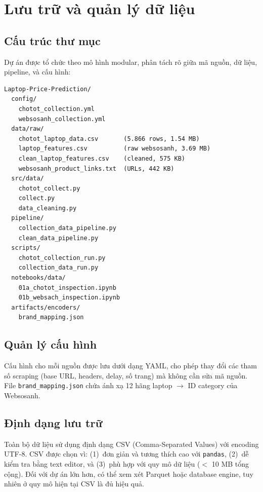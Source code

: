 \section{Lưu trữ và quản lý dữ liệu}
\label{sec:data-management}

\subsection{Cấu trúc thư mục}

Dự án được tổ chức theo mô hình modular, phân tách rõ giữa mã nguồn, dữ liệu, pipeline, và cấu hình:

\begin{lstlisting}[language={}, basicstyle=\ttfamily\small, frame=single, caption={Cấu trúc thư mục dự án}, label={lst:project-structure}]
Laptop-Price-Prediction/
  config/
    chotot_collection.yml
    websosanh_collection.yml
  data/raw/
    chotot_laptop_data.csv       (5.866 rows, 1.54 MB)
    laptop_features.csv          (raw websosanh, 3.69 MB)
    clean_laptop_features.csv    (cleaned, 575 KB)
    websosanh_product_links.txt  (URLs, 442 KB)
  src/data/
    chotot_collect.py
    collect.py
    data_cleaning.py
  pipeline/
    collection_data_pipeline.py
    clean_data_pipeline.py
  scripts/
    chotot_collection_run.py
    collection_data_run.py
  notebooks/data/
    01a_chotot_inspection.ipynb
    01b_websach_inspection.ipynb
  artifacts/encoders/
    brand_mapping.json
\end{lstlisting}

\subsection{Quản lý cấu hình}

Cấu hình cho mỗi nguồn được lưu dưới dạng YAML, cho phép thay đổi các tham số scraping (base URL, headers, delay, số trang) mà không cần sửa mã nguồn. File \texttt{brand\_mapping.json} chứa ánh xạ 12 hãng laptop $\rightarrow$ ID category của Websosanh.

\subsection{Định dạng lưu trữ}

Toàn bộ dữ liệu sử dụng định dạng CSV (Comma-Separated Values) với encoding UTF-8. CSV được chọn vì: (1)~đơn giản và tương thích cao với \texttt{pandas}\cite{mckinney2010pandas}, (2)~dễ kiểm tra bằng text editor, và (3)~phù hợp với quy mô dữ liệu ($<$ 10 MB tổng cộng). Đối với dự án lớn hơn, có thể xem xét Parquet hoặc database engine, tuy nhiên ở quy mô hiện tại CSV là đủ hiệu quả.

